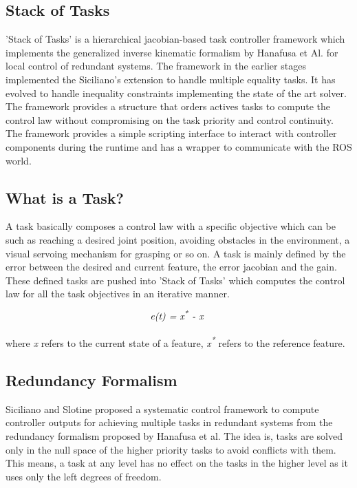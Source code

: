 \subsection{Stack of Tasks}
'Stack of Tasks' is a hierarchical jacobian-based task controller framework which implements the generalized inverse kinematic formalism by Hanafusa et Al. for local control of redundant systems\cite{hanafusa1981analysis}\cite{Mansard2009ik}. The framework in the earlier stages implemented the Siciliano's extension to handle multiple equality tasks\cite{siciliano1991general}. It has evolved to handle inequality constraints implementing the state of the art solver. The framework provides a structure that orders actives tasks to compute the control law without compromising on the task priority and control continuity. The framework provides a simple scripting interface to interact with controller components during the runtime and has a wrapper to communicate with the ROS world.


\subsection{What is a Task?}
A task basically composes a control law with a specific objective which can be such as reaching a desired joint position, avoiding obstacles in the environment, a visual servoing mechanism for grasping or so on. A task is mainly defined by the error between the desired and current feature, the error jacobian and the gain. These defined tasks are pushed into 'Stack of Tasks' which computes the control law for all the task objectives in an iterative manner\cite{mansard2007task}. 

\[\textit{e(t) = x\textsuperscript{*} - x }\]

where \textit{x} refers to the current state of a feature, \textit{x\textsuperscript{*}} refers to the reference feature.

\subsection{Redundancy Formalism}
Siciliano and Slotine proposed a systematic control framework to compute controller outputs for achieving multiple tasks in redundant systems from the redundancy formalism proposed by Hanafusa et al. The idea is, tasks are solved only in the null space of the higher priority tasks to avoid conflicts with them. This means, a task at any level has no effect on the tasks in the higher level as it uses only the left degrees of freedom. 

